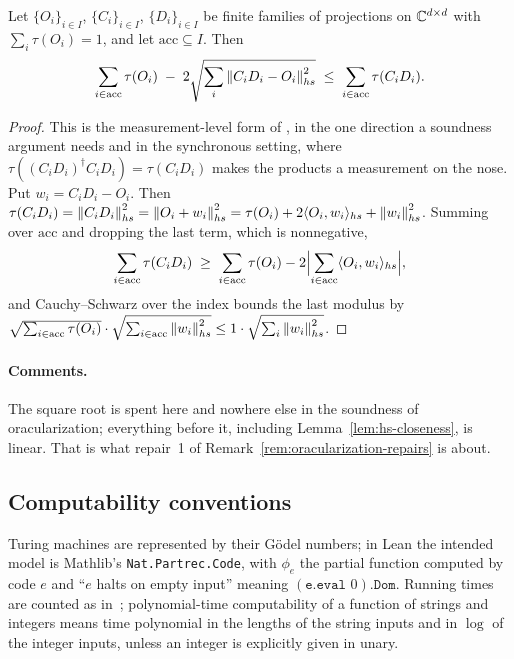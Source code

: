 \begin{lemma}
\label{lem:close-measurements-close-values}
\leanok
Let $\{O_i\}_{i \in I}$, $\{C_i\}_{i \in I}$, $\{D_i\}_{i \in I}$ be finite families of
projections on $\mathbb{C}^{d \times d}$ with $\sum_i \tau(O_i) = 1$, and let
$\mathrm{acc} \subseteq I$. Then
\begin{equation*}
  \sum_{i \in \mathrm{acc}} \tau(O_i)
    \;-\; 2 \sqrt{\sum_i \left\| {C_i D_i - O_i} \right\|_{hs}^2}
    \;\leq\; \sum_{i \in \mathrm{acc}} \tau(C_i D_i).
\end{equation*}
\end{lemma}
\begin{proof}
\leanok
This is the measurement-level form of \cite[Fact 4.31]{NW19}, in the one direction a soundness
argument needs and in the synchronous setting, where $\tau((C_iD_i)^\dagger C_iD_i) =
\tau(C_iD_i)$ makes the products a measurement on the nose. Put $w_i = C_iD_i - O_i$. Then
$\tau(C_iD_i) = \left\| {C_iD_i} \right\|_{hs}^2 = \left\| {O_i + w_i} \right\|_{hs}^2 = \tau(O_i) +
2\langle O_i, w_i\rangle_{hs} + \left\| {w_i} \right\|_{hs}^2$. Summing over $\mathrm{acc}$ and dropping
the last term, which is nonnegative,
\begin{equation*}
  \sum_{i \in \mathrm{acc}} \tau(C_iD_i) \;\geq\; \sum_{i \in \mathrm{acc}} \tau(O_i)
    - 2 \Bigl| \sum_{i \in \mathrm{acc}} \langle O_i, w_i \rangle_{hs} \Bigr|,
\end{equation*}
and Cauchy--Schwarz over the index bounds the last modulus by
$\sqrt{\sum_{i \in \mathrm{acc}} \tau(O_i)} \cdot \sqrt{\sum_{i \in \mathrm{acc}}
\left\| {w_i} \right\|_{hs}^2} \leq 1 \cdot \sqrt{\sum_i \left\| {w_i} \right\|_{hs}^2}$.
\end{proof}

\paragraph{Comments.} The square root is spent here and nowhere else in the soundness of
oracularization; everything before it, including Lemma~\ref{lem:hs-closeness}, is linear.
That is what repair~1 of Remark~\ref{rem:oracularization-repairs} is about.

\subsection{Computability conventions}
\label{sec:computability-conventions}

Turing machines are represented by their G\"odel numbers; in Lean the intended model is
Mathlib's \texttt{Nat.Partrec.Code}, with $\phi_e$ the partial function computed by
code $e$ and ``$e$ halts on empty input'' meaning $(\texttt{e.eval } 0).\texttt{Dom}$.
Running times are counted as in~\cite{MNY}; polynomial-time computability of a function
of strings and integers means time polynomial in the lengths of the string inputs and
in $\log$ of the integer inputs, unless an integer is explicitly given in unary.


